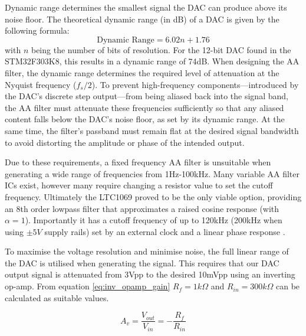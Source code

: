 Dynamic range determines the smallest signal the DAC can produce above its noise floor. The theoretical dynamic range (in dB) of a DAC is given by the following formula\cite{gaddyDYNAMICPERFORMANCETESTING}:
\begin{equation}
    \text{Dynamic Range}=6.02n + 1.76 
    \label{eq:dac_range}
\end{equation}
with $n$ being the number of bits of resolution. For the 12-bit \ac{DAC} found in the STM32F303K8, this results in a dynamic range of 74dB. When designing the AA filter, the dynamic range determines the required level of attenuation at the Nyquist frequency ($f_s/2$). To prevent high-frequency components—introduced by the DAC's discrete step output—from being aliased back into the signal band, the AA filter must attenuate these frequencies sufficiently so that any aliased content falls below the DAC's noise floor, as set by its dynamic range. At the same time, the filter's passband must remain flat at the desired signal bandwidth to avoid distorting the amplitude or phase of the intended output. 


Due to these requirements, a fixed frequency AA filter is unsuitable when generating a wide range of frequencies from 1Hz-100kHz. Many variable AA filter ICs exist, however many require changing a resistor value to set the cutoff frequency.  Ultimately the LTC1069 proved to be the only viable option, providing an 8th order lowpass filter that approximates a raised cosine response (with $\alpha=1$). Importantly it has a cutoff frequency of up to 120kHz (200kHz when using $\pm5V$ supply rails) set by an external clock and a linear phase response \cite{LTC10697CS8PBF}. 

To maximise the voltage resolution and minimise noise, the full linear range of the DAC is utilised when generating the signal. This requires that our DAC output signal is attenuated from 3Vpp to the desired 10mVpp using an inverting op-amp. From equation \ref{eq:inv_opamp_gain} $R_{f}=1k\Omega$ and $R_{in}=300k\Omega$ can be calculated as suitable values.

\begin{equation}
    A_v = \frac{V_{out}}{V_{in}} = -\frac{R_f}{R_{in}}
    \label{eq:inv_opamp_gain}
\end{equation}


